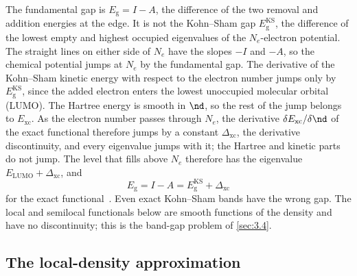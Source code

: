 The fundamental gap is $E_{\mathrm{g}} = I - A$, the difference of the two removal and addition energies at the edge. It is not the Kohn--Sham gap $E_{\mathrm{g}}^{\mathrm{KS}}$, the difference of the lowest empty and highest occupied eigenvalues of the $N_e$-electron potential. The straight lines on either side of $N_e$ have the slopes $-I$ and $-A$, so the chemical potential jumps at $N_e$ by the fundamental gap. The derivative of the Kohn--Sham kinetic energy with respect to the electron number jumps only by $E_{\mathrm{g}}^{\mathrm{KS}}$, since the added electron enters the lowest unoccupied molecular orbital (LUMO). The Hartree energy is smooth in $\nd$, so the rest of the jump belongs to $E_{\mathrm{xc}}$. As the electron number passes through $N_e$, the derivative $\delta E_{\mathrm{xc}}/\delta\nd$ of the exact functional therefore jumps by a constant $\Delta_{\mathrm{xc}}$, the derivative discontinuity, and every eigenvalue jumps with it; the Hartree and kinetic parts do not jump. The level that fills above $N_e$ therefore has the eigenvalue $E_{\mathrm{LUMO}} + \Delta_{\mathrm{xc}}$, and
\begin{equation}
  E_{\mathrm{g}} = I - A = E_{\mathrm{g}}^{\mathrm{KS}} + \Delta_{\mathrm{xc}}
  \label{eq:D.5-gap}
\end{equation}
for the exact functional~\cite{perdew1983physical,sham1983density}. Even exact Kohn--Sham bands have the wrong gap. The local and semilocal functionals below are smooth functions of the density and have no discontinuity; this is the band-gap problem of \cref{sec:3.4}.

\subsection*{The local-density approximation}


